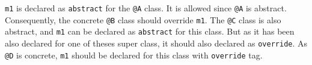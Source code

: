 \lstinline[language=galgas]!m1! is declared as \lstinline[language=galgas]!abstract! for the \lstinline[language=galgas]!@A! class. It is allowed since \lstinline[language=galgas]!@A! is abstract. Consequently, the concrete \lstinline[language=galgas]!@B! class should override \lstinline[language=galgas]!m1!. The \lstinline[language=galgas]!@C! class is also abstract, and \lstinline[language=galgas]!m1! can be declared as \lstinline[language=galgas]!abstract! for this class. But as it has been also declared for one of theses super class, it should also declared as \lstinline[language=galgas]!override!. As \lstinline[language=galgas]!@D! is concrete, \lstinline[language=galgas]!m1! should be declared for this class with \lstinline[language=galgas]!override! tag.










